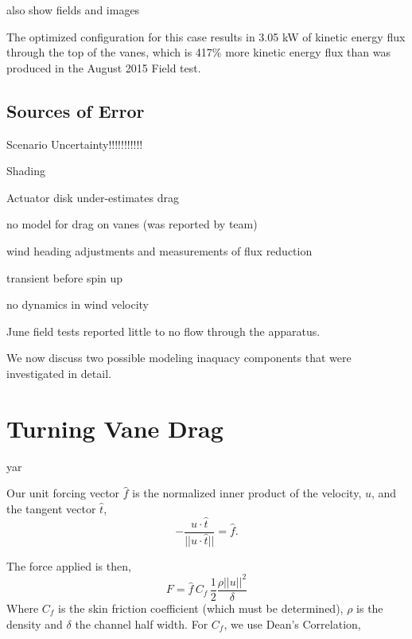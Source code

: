 also show fields and images

The optimized configuration for this case results in 3.05 kW of kinetic
energy flux through the top of the vanes, which is 417\% more kinetic
energy flux than was produced in the August 2015 Field test.


\subsection{Sources of Error}
\label{sec:field_error}
%

Scenario Uncertainty!!!!!!!!!!!

Shading

Actuator disk under-estimates drag

no model for drag on vanes (was reported by team)

wind heading adjustments and measurements of flux reduction

transient before spin up

no dynamics in wind velocity

June field tests reported little to no flow through the apparatus. 

We now discuss two possible modeling inaquacy components that were
investigated in detail. 

\section{Turning Vane Drag}

yar

Our unit forcing vector $\hat f$ is the normalized inner product of the 
velocity, $u$, and the tangent vector $\hat t$, 
\begin{equation}
- \frac{u \cdot \hat t}{|| u \cdot \hat t ||} = \hat f. 
\end{equation}

The force applied is then, 
\begin{equation}
 F = \hat f \, C_f \, \frac{1}{2} \frac{\rho || u ||^2}{\delta}
\end{equation}
Where $C_f$ is the skin friction coefficient (which must be determined),
$\rho $ is the density and $\delta$ the channel half width. 
For $C_f$, we use Dean's Correlation\cite{?}, 

